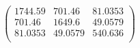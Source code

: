 \documentclass{article}
\begin{document}
\[\left(
\begin{array}{ccc}
 1744.59 & 701.46 & 81.0353 \\
 701.46 & 1649.6 & 49.0579 \\
 81.0353 & 49.0579 & 540.636 \\
\end{array}
\right)\]
\end{document}
